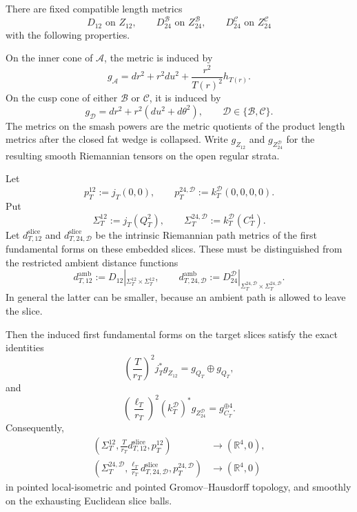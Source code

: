 \begin{theorem}
\label{wb:sphere-metric-fixed-realization}
There are fixed compatible length metrics
\[
 D_{12}\text{ on }Z_{12},\qquad
 D_{24}^{\mathcal B}\text{ on }Z_{24}^{\mathcal B},\qquad
 D_{24}^{\mathcal C}\text{ on }Z_{24}^{\mathcal C}
\]
with the following properties.

On the inner cone of \(\mathcal A\), the metric is induced by
\begin{equation}
 g_{\mathcal A}
 =dr^2+r^2du^2+\frac{r^2}{T(r)^2}h_{T(r)}.
 \label{wb:sphere-metric-A-fixed-metric}
\end{equation}
On the cusp cone of either \(\mathcal B\) or \(\mathcal C\), it is induced
by
\begin{equation}
 g_{\mathcal D}=dr^2+r^2(du^2+d\theta^2),
 \qquad\mathcal D\in\{\mathcal B,\mathcal C\}.
 \label{wb:sphere-metric-BC-fixed-metric}
\end{equation}
The metrics on the smash powers are the metric quotients of the product
length metrics after the closed fat wedge is collapsed.  Write
\(g_{Z_{12}}\) and \(g_{Z_{24}^{\mathcal D}}\) for the resulting smooth
Riemannian tensors on the open regular strata.

Let
\[
 p_T^{12}:=j_T(0,0),\qquad
 p_T^{24,\mathcal D}:=k_T^{\mathcal D}(0,0,0,0).
\]
Put
\[
 \Sigma_T^{12}:=j_T(Q_T^2),\qquad
 \Sigma_T^{24,\mathcal D}:=k_T^{\mathcal D}(C_T^4).
\]
Let \(d_{T,12}^{\mathrm{slice}}\) and
\(d_{T,24,\mathcal D}^{\mathrm{slice}}\) be the intrinsic Riemannian path
metrics of the first fundamental forms on these embedded slices.  These
must be distinguished from the restricted ambient distance functions
\[
 d_{T,12}^{\mathrm{amb}}
 :=D_{12}|_{\Sigma_T^{12}\times\Sigma_T^{12}},\qquad
 d_{T,24,\mathcal D}^{\mathrm{amb}}
 :=D_{24}^{\mathcal D}|_{\Sigma_T^{24,\mathcal D}
                         \times\Sigma_T^{24,\mathcal D}}.
\]
In general the latter can be smaller, because an ambient path is allowed
to leave the slice.

Then the induced first fundamental forms on the target slices satisfy the
exact identities
\begin{equation}
 \left(\frac{T}{r_T}\right)^2
  j_T^*g_{Z_{12}}
 =g_{Q_T}\oplus g_{Q_T},
 \label{wb:sphere-metric-A-slice-exact}
\end{equation}
and
\begin{equation}
 \left(\frac{\ell_T}{r_T}\right)^2
  (k_T^{\mathcal D})^*g_{Z_{24}^{\mathcal D}}
 =g_{C_T}^{\oplus4}.
 \label{wb:sphere-metric-BC-slice-exact}
\end{equation}
Consequently,
\begin{align}
 \left(\Sigma_T^{12},\frac{T}{r_T}d_{T,12}^{\mathrm{slice}},
       p_T^{12}\right)
 &\longrightarrow(\mathbb R^4,0),\\
 \left(\Sigma_T^{24,\mathcal D},
       \frac{\ell_T}{r_T}d_{T,24,\mathcal D}^{\mathrm{slice}},
       p_T^{24,\mathcal D}\right)
 &\longrightarrow(\mathbb R^4,0)
 \label{wb:sphere-metric-slice-fixed-blowups}
\end{align}
in pointed local-isometric and pointed Gromov--Hausdorff topology, and
smoothly on the exhausting Euclidean slice balls.


\end{theorem}
